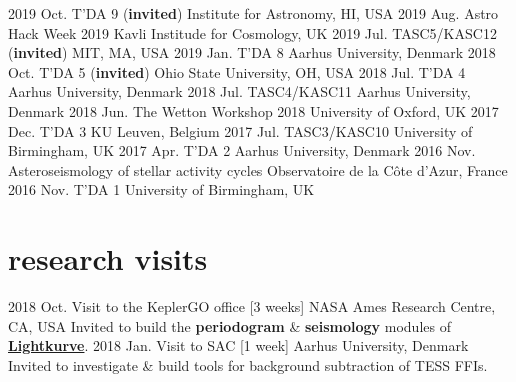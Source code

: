 \documentclass[letterpaper]{k-cv} %
\begin{document}
\begin{entrylist}
\entrythree
{2019 Oct.}
{T'DA 9 (\textbf{\textcolor{c2}{invited}})}
{Institute for Astronomy, HI, USA}
\entrythree
{2019 Aug.}
{Astro Hack Week 2019}
{Kavli Institude for Cosmology, UK}
\entrythree
{2019 Jul.}
{TASC5/KASC12  (\textbf{\textcolor{c2}{invited}})}
{MIT, MA, USA}
\entrythree
{2019 Jan.}
{T'DA 8}
{Aarhus University, Denmark}
\entrythree
{2018 Oct.}
{T'DA 5 (\textbf{\textcolor{c2}{invited}})}
{Ohio State University, OH, USA}
\entrythree
{2018 Jul.}
{T'DA 4}
{Aarhus University, Denmark}
\entrythree
{2018 Jul.}
{TASC4/KASC11}
{Aarhus University, Denmark}
\entrythree
{2018 Jun.}
{The Wetton Workshop 2018}
{University of Oxford, UK}
\entrythree
{2017 Dec.}
{T'DA 3}
{KU Leuven, Belgium}
\entrythree
{2017 Jul.}
{TASC3/KASC10}
{University of Birmingham, UK}
\entrythree
{2017 Apr.}
{T'DA 2}
{Aarhus University, Denmark}
\entrythree
{2016 Nov.}
{Asteroseismology of stellar activity cycles}
{Observatoire de la C\^{o}te d'Azur, France}
\entrythree
{2016 Nov.}
{T'DA 1}
{University of Birmingham, UK}
\end{entrylist}


\section{\color{c3}research visits}
\begin{entrylist}
\entry
{2018 Oct.}
{Visit to the KeplerGO office [3 weeks]}
{NASA Ames Research Centre, CA, USA}
{Invited to build the \textbf{\textcolor{c3}{periodogram}} \&  \textbf{\textcolor{c3}{seismology}} modules of \textbf{\textcolor{c3}{\href{http://docs.lightkurve.org/}{Lightkurve}}}.}
\entry
{2018 Jan.}
{Visit to SAC [1 week]}
{Aarhus University, Denmark}
{Invited to investigate \& build tools for background subtraction of TESS FFIs.}
\end{entrylist}
\end{document}
